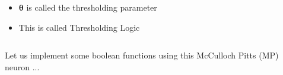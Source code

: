 \documentclass[serif, aspectratio=169]{beamer}
\begin{document}
\begin{frame}
\begin{columns}
\begin{overlayarea}{\textwidth}{\textheight}
\begin{itemize}

				      \vspace{-0.4in}
				\item<15-> $\mathbf{\theta}$ is called the thresholding parameter
				\item<16-> This is called Thresholding Logic
			\end{itemize}
		\end{overlayarea}


	\end{columns}
\end{frame}


\begin{frame}
	Let us implement some boolean functions using this McCulloch Pitts (MP) neuron ...
\end{frame}
\end{document}
